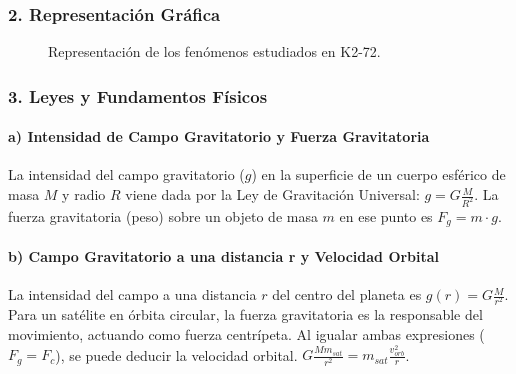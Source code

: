 \subsubsection*{2. Representación Gráfica}
\begin{figure}[H]
    \centering
    \hfill
    \caption{Representación de los fenómenos estudiados en K2-72.}
\end{figure}

\subsubsection*{3. Leyes y Fundamentos Físicos}
\paragraph*{a) Intensidad de Campo Gravitatorio y Fuerza Gravitatoria}
La intensidad del campo gravitatorio ($g$) en la superficie de un cuerpo esférico de masa $M$ y radio $R$ viene dada por la Ley de Gravitación Universal: $g = G \frac{M}{R^2}$. La fuerza gravitatoria (peso) sobre un objeto de masa $m$ en ese punto es $F_g = m \cdot g$.

\paragraph*{b) Campo Gravitatorio a una distancia r y Velocidad Orbital}
La intensidad del campo a una distancia $r$ del centro del planeta es $g(r) = G \frac{M}{r^2}$. Para un satélite en órbita circular, la fuerza gravitatoria es la responsable del movimiento, actuando como fuerza centrípeta. Al igualar ambas expresiones ($F_g = F_c$), se puede deducir la velocidad orbital.
$G \frac{M m_{sat}}{r^2} = m_{sat} \frac{v_{orb}^2}{r}$.

